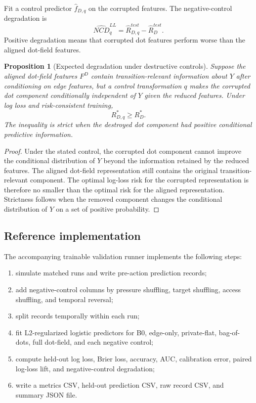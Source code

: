 \documentclass[11pt]{article}
\newtheorem{proposition}{Proposition}
\theoremstyle{remark}
\begin{document}
Fit a control predictor $\widehat f_{D,q}$ on the corrupted features. The
negative-control degradation is
\[
\widehat{NCD}_{q}^{LL}
=
\widehat R_{D,q}^{test}-\widehat R_D^{test}.
\]
Positive degradation means that corrupted dot features perform worse than the
aligned dot-field features.

\begin{proposition}[Expected degradation under destructive controls]\label{prop-negative-control-degradation}
Suppose the aligned dot-field features $F^D$ contain transition-relevant
information about $Y$ after conditioning on edge features, but a control
transformation $q$ makes the corrupted dot component conditionally independent
of $Y$ given the reduced features. Under log loss and risk-consistent training,
\[
R_{D,q}^*\geq R_D^*.
\]
The inequality is strict when the destroyed dot component had positive
conditional predictive information.
\end{proposition}

\begin{proof}
Under the stated control, the corrupted dot component cannot improve the
conditional distribution of $Y$ beyond the information retained by the reduced
features. The aligned dot-field representation still contains the original
transition-relevant component. The optimal log-loss risk for the corrupted
representation is therefore no smaller than the optimal risk for the aligned
representation. Strictness follows when the removed component changes the
conditional distribution of $Y$ on a set of positive probability.
\end{proof}

\subsection{Reference implementation}\label{trainable-reference-implementation}

The accompanying trainable validation runner implements the following steps:

\begin{enumerate}[leftmargin=*]
\item simulate matched runs and write pre-action prediction records;
\item add negative-control columns by pressure shuffling, target shuffling,
access shuffling, and temporal reversal;
\item split records temporally within each run;
\item fit L2-regularized logistic predictors for B0, edge-only, private-flat,
bag-of-dots, full dot-field, and each negative control;
\item compute held-out log loss, Brier loss, accuracy, AUC, calibration error,
paired log-loss lift, and negative-control degradation;
\item write a metrics CSV, held-out prediction CSV, raw record CSV, and summary
JSON file.
\end{enumerate}
\end{document}
